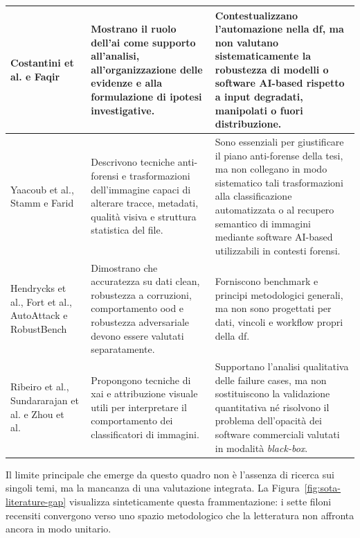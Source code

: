\begin{table}[H]
\begin{tabularx}{\textwidth}{@{}p{3.8cm} X X@{}}
\midrule


Costantini et al. e Faqir~\cite{costantini2019digital,faqir2023digital} &
Mostrano il ruolo dell'\gls{ai} come supporto all'analisi, all'organizzazione delle evidenze e alla formulazione di ipotesi investigative. &
Contestualizzano l'automazione nella \gls{df}, ma non valutano sistematicamente la robustezza di modelli o software AI-based rispetto a input degradati, manipolati o fuori distribuzione. \\

\midrule


Yaacoub et al., Stamm e Farid~\cite{yaacoub2021digital,stamm2010anti,farid2016photo} &
Descrivono tecniche anti-forensi e trasformazioni dell'immagine capaci di alterare tracce, metadati, qualità visiva e struttura statistica del file. &
Sono essenziali per giustificare il piano anti-forense della tesi, ma non collegano in modo sistematico tali trasformazioni alla classificazione automatizzata o al recupero semantico di immagini mediante software AI-based utilizzabili in contesti forensi. \\

\midrule


Hendrycks et al., Fort et al., AutoAttack e RobustBench~\cite{hendrycks2019benchmarking,hendrycks2017baseline,fort2021exploring,croce2020autoattack,croce2020robustbench} &
Dimostrano che accuratezza su dati clean, robustezza a corruzioni, comportamento \gls{ood} e robustezza adversariale devono essere valutati separatamente. &
Forniscono benchmark e principi metodologici generali, ma non sono progettati per dati, vincoli e workflow propri della \gls{df}. \\

\midrule


Ribeiro et al., Sundararajan et al. e Zhou et al.~\cite{Ribeiro2016,Sundararajan2017,Zhou2016} &
Propongono tecniche di \gls{xai} e attribuzione visuale utili per interpretare il comportamento dei classificatori di immagini. &
Supportano l'analisi qualitativa delle failure cases, ma non sostituiscono la validazione quantitativa né risolvono il problema dell'opacità dei software commerciali valutati in modalità \textit{black-box}. \\

\bottomrule
\end{tabularx}
\end{table}

Il limite principale che emerge da questo quadro non è l'assenza di ricerca
sui singoli temi, ma la mancanza di una valutazione integrata.
La Figura~\ref{fig:sota-literature-gap} visualizza sinteticamente questa
frammentazione: i sette filoni recensiti convergono verso uno spazio
metodologico che la letteratura non affronta ancora in modo unitario.


